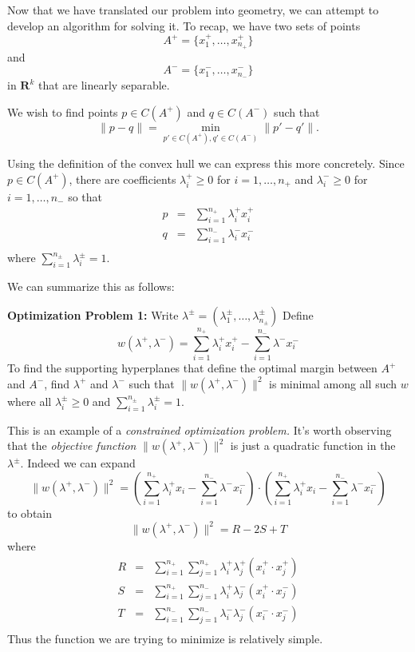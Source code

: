 \documentclass[
]{article}
\begin{document}
Now that we have translated our problem into geometry, we can attempt to
develop an algorithm for solving it. To recap, we have two sets of
points \[
A^{+}=\{x^+_1,\ldots, x^+_{n_{+}}\}
\] and \[
A^{-}=\{x^-_1,\ldots, x^-_{n_{-}}\}
\] in \(\mathbf{R}^{k}\) that are linearly separable.

We wish to find points \(p\in C(A^{+})\) and \(q\in C(A^{-})\) such that
\[
\|p-q\|=\min_{p'\in C(A^{+}),q'\in C(A^{-})} \|p'-q'\|.
\]

Using the definition of the convex hull we can express this more
concretely. Since \(p\in C(A^{+})\), there are coefficients
\(\lambda^{+}_{i}\ge 0\) for \(i=1,\ldots,n_{+}\) and
\(\lambda^{-}_{i}\ge 0\) for \(i=1,\ldots, n_{-}\) so that \[
\begin{aligned}
p&=&\sum_{i=1}^{n_{+}}\lambda^{+}_{i} x^{+}_{i} \\
q&=&\sum_{i=1}^{n_{-}}\lambda^{-}_{i} x^{-}_{i} \\
\end{aligned}
\] where \(\sum_{i=1}^{n_{\pm}} \lambda_{i}^{\pm}=1\).

We can summarize this as follows:

\textbf{Optimization Problem 1:} Write
\(\lambda^{\pm}=(\lambda^{\pm}_{1},\ldots, \lambda^{\pm}_{n_{\pm}})\)
Define \[
w(\lambda^+,\lambda^-) = \sum_{i=1}^{n_{+}}\lambda^{+}_{i}x^{+}_{i} - \sum_{i=1}^{n_{-}}\lambda^{-}x^{-}_{i}
\] To find the supporting hyperplanes that define the optimal margin
between \(A^{+}\) and \(A^{-}\), find \(\lambda^{+}\) and
\(\lambda^{-}\) such that \(\|w(\lambda^{+},\lambda^{-})\|^2\) is
minimal among all such \(w\) where all \(\lambda^{\pm}_{i}\ge 0\) and
\(\sum_{i=1}^{n_{\pm}} \lambda^{\pm}_{i}=1\).

This is an example of a \emph{constrained optimization problem.} It's
worth observing that the \emph{objective function}
\(\|w(\lambda^{+},\lambda^{-})\|^2\) is just a quadratic function in the
\(\lambda^{\pm}.\) Indeed we can expand \[
\|w(\lambda^{+},\lambda^{-})\|^2 = (\sum_{i=1}^{n_{+}}\lambda^{+}_{i}x_{i}- \sum_{i=1}^{n_{-}}\lambda^{-}x^{-}_{i})\cdot(\sum_{i=1}^{n_{+}}\lambda^{+}_{i}x_{i}- \sum_{i=1}^{n_{-}}\lambda^{-}x^{-}_{i})
\] to obtain \[
\|w(\lambda^{+},\lambda^{-})\|^2 = R -2S +T
\] where \begin{equation}
\begin{aligned}
R &=& \sum_{i=1}^{n_{+}}\sum_{j=1}^{n_{+}}\lambda^{+}_{i}\lambda^{+}_{j}(x^{+}_{i}\cdot x^{+}_{j}) \\
S &=& \sum_{i=1}^{n_{+}}\sum_{j=1}^{n_{-}}\lambda^{+}_{i}\lambda^{-}_{j}(x^{+}_{i}\cdot x^{-}_{j}) \\
T &=& \sum_{i=1}^{n_{-}}\sum_{j=1}^{n_{-}}\lambda^{-}_{i}\lambda^{-}_{j}(x^{-}_{i}\cdot x^{-}_{j}) \\
\end{aligned}
\label{eq:kernel}\end{equation} Thus the function we are trying to
minimize is relatively simple.
\end{document}
